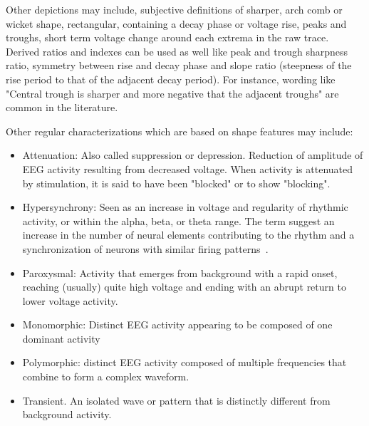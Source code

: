 Other depictions may include, subjective definitions of sharper, arch comb or wicket shape, rectangular, containing a decay phase or voltage rise, peaks and troughs, short term voltage change around each extrema in the raw trace.  Derived ratios and indexes can be used as well like peak and trough sharpness ratio, symmetry between rise and decay phase and slope ratio (steepness of the rise period to that of the adjacent decay period).  For instance,  wording like "Central trough is sharper and more negative that the adjacent troughs" are common in the literature.

Other regular characterizations which are based on shape features may include:

\begin{itemize}
\item Attenuation: Also called suppression or depression. Reduction of amplitude of EEG activity resulting from decreased voltage. When activity is attenuated by stimulation, it is said to have been "blocked" or to show "blocking".
\item Hypersynchrony: Seen as an increase in voltage and regularity of rhythmic activity, or within the alpha, beta, or theta range. The term suggest an increase in the number of neural elements contributing to the rhythm and a synchronization of neurons with similar firing patterns~\cite{Buzsaki2012}.
\item Paroxysmal: Activity that emerges from background with a rapid onset, reaching (usually) quite high voltage and ending with an abrupt return to lower voltage activity. 
\end{itemize}

\begin{itemize}
\item Monomorphic: Distinct EEG activity appearing to be composed of one dominant activity
\item Polymorphic: distinct EEG activity composed of multiple frequencies that combine to form a complex waveform.
\item Transient. An isolated wave or pattern that is distinctly different from background activity.
\end{itemize}


